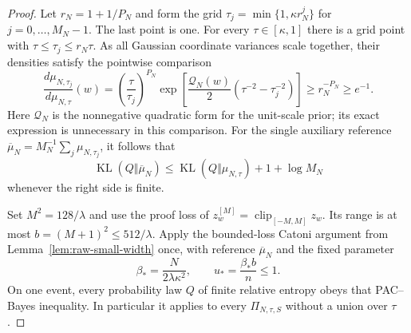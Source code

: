 \begin{proof}
Let $r_N=1+1/P_N$ and form the grid
$\tau_j=\min\{1,\kappa r_N^j\}$ for $j=0,\ldots,M_N-1$.
The last point is one.  For every $\tau\in[\kappa,1]$ there is a grid
point with $\tau\leq\tau_j\leq r_N\tau$.
As all Gaussian coordinate variances scale together, their densities
satisfy the pointwise comparison
\[
 \frac{d\mu_{N,\tau_j}}{d\mu_{N,\tau}}(w)
 =\left(\frac\tau{\tau_j}\right)^{P_N}
   \exp\left[\frac{\mathcal Q_N(w)}2
                  (\tau^{-2}-\tau_j^{-2})\right]
 \geq r_N^{-P_N}\geq e^{-1}.
\]
Here $\mathcal Q_N$ is the nonnegative quadratic form for the
unit-scale prior; its exact expression is unnecessary in this comparison.
For the single auxiliary reference
$\overline\mu_N=M_N^{-1}\sum_j\mu_{N,\tau_j}$, it follows that
\begin{equation}
 \operatorname{KL}(Q\Vert\overline\mu_N)
 \leq\operatorname{KL}(Q\Vert\mu_{N,\tau})+1+\log M_N
 \label{eq:scale-grid-domination}
\end{equation}
whenever the right side is finite.

Set $M^2=128/\lambda$ and use the proof loss of
$z_w^{[M]}=\operatorname{clip}_{[-M,M]}z_w$.
Its range is at most $b=(M+1)^2\leq512/\lambda$.
Apply the bounded-loss Catoni argument from
Lemma~\ref{lem:raw-small-width} once, with reference
$\overline\mu_N$ and the fixed parameter
\[
 \beta_* =\frac{N}{2\lambda\kappa^2},\qquad
 u_* =\frac{\beta_*b}{n}\leq1.
\]
On one event, every probability law $Q$ of finite relative entropy
obeys that PAC--Bayes inequality.  In particular it applies to every
$\Pi_{N,\tau,S}$ without a union over $\tau$.


\end{proof}
